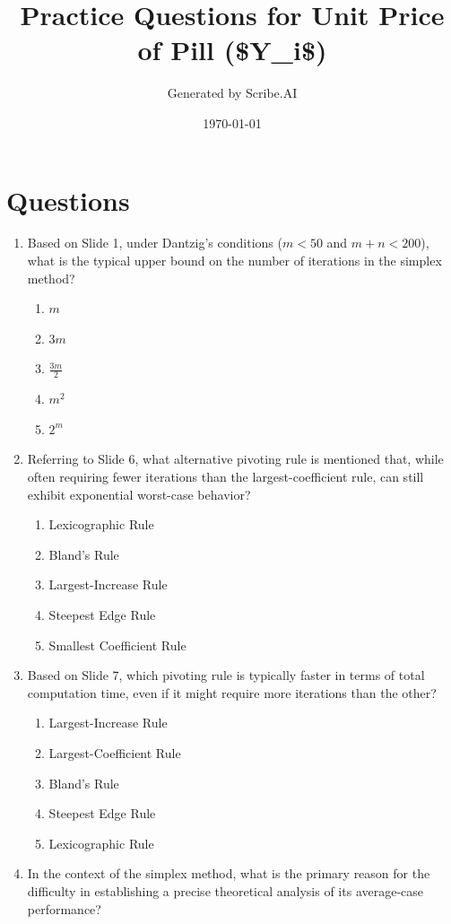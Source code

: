 \documentclass{article}%
\title{Practice Questions for Unit Price of Pill (\$Y\_i\$)}%
\author{Generated by Scribe.AI}%
\date{\today}%
\begin{document}
%
\normalsize%
\maketitle%
\section{Questions}%
\label{sec:Questions}%
\begin{enumerate}%
\item Based on Slide 1, under Dantzig's conditions ($m < 50$ and $m + n < 200$), what is the typical upper bound on the number of iterations in the simplex method?%
\begin{enumerate}%
\item $m$%
\item $3m$%
\item $\frac{3m}{2}$%
\item $m^2$%
\item $2^m$%
\end{enumerate}%
\vspace{1em}%
\item Referring to Slide 6, what alternative pivoting rule is mentioned that, while often requiring fewer iterations than the largest-coefficient rule, can still exhibit exponential worst-case behavior?%
\begin{enumerate}%
\item Lexicographic Rule%
\item Bland's Rule%
\item Largest-Increase Rule%
\item Steepest Edge Rule%
\item Smallest Coefficient Rule%
\end{enumerate}%
\vspace{1em}%
\item Based on Slide 7, which pivoting rule is typically faster in terms of total computation time, even if it might require more iterations than the other?%
\begin{enumerate}%
\item Largest-Increase Rule%
\item Largest-Coefficient Rule%
\item Bland's Rule%
\item Steepest Edge Rule%
\item Lexicographic Rule%
\end{enumerate}%
\vspace{1em}%
\item In the context of the simplex method, what is the primary reason for the difficulty in establishing a precise theoretical analysis of its average-case performance?%

\end{enumerate}
\end{document}
